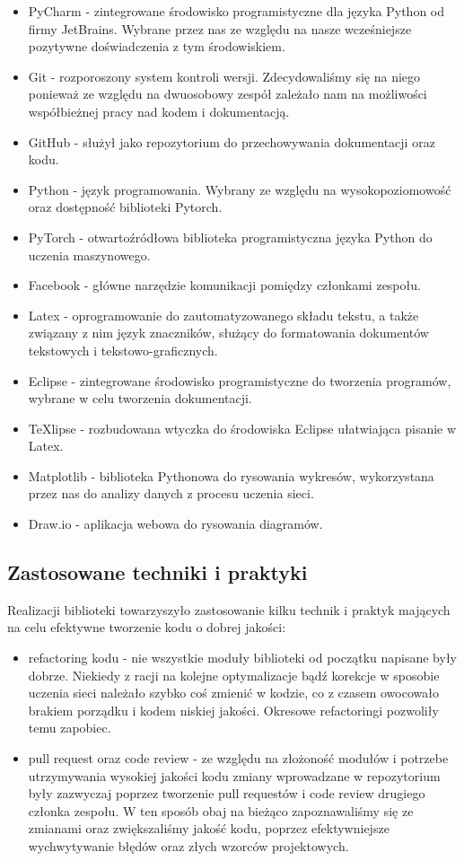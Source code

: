 \begin{itemize}
  \item PyCharm - zintegrowane środowisko programistyczne dla języka Python od firmy JetBrains.
  Wybrane przez nas ze względu na nasze wcześniejsze pozytywne doświadczenia z tym środowiskiem.
  \item Git - rozporoszony system kontroli wersji. Zdecydowaliśmy się na niego ponieważ ze względu na 
  dwuosobowy zespół zależało nam na możliwości współbieżnej pracy nad kodem i dokumentacją.
  \item GitHub - służył jako repozytorium do przechowywania dokumentacji oraz kodu.
  \item Python - język programowania. Wybrany ze względu na wysokopoziomowość oraz dostępność biblioteki Pytorch.
  \item PyTorch - otwartoźródłowa biblioteka programistyczna języka Python do uczenia maszynowego.
  \item Facebook - główne narzędzie komunikacji pomiędzy członkami zespołu.
  \item Latex - oprogramowanie do zautomatyzowanego składu tekstu, a także związany z nim język 
  znaczników, służący do formatowania dokumentów tekstowych i tekstowo-graficznych. 
  \item Eclipse - zintegrowane środowisko programistyczne do tworzenia programów, wybrane w celu tworzenia 
  dokumentacji.
  \item TeXlipse - rozbudowana wtyczka do środowiska Eclipse ułatwiająca pisanie w Latex.  
  \item Matplotlib - biblioteka Pythonowa do rysowania wykresów, wykorzystana przez nas do analizy danych 
  z procesu uczenia sieci. 
  \item Draw.io - aplikacja webowa do rysowania diagramów.
\end{itemize}

\subsection{Zastosowane techniki i praktyki}
Realizacji biblioteki towarzyszyło zastosowanie kilku technik i praktyk mających na celu efektywne 
tworzenie kodu o dobrej jakości:
\begin{itemize}
  \item refactoring kodu - nie wszystkie moduły biblioteki od początku napisane były dobrze. Niekiedy z racji 
  na kolejne optymalizacje bądź korekcje w sposobie uczenia sieci należało szybko coś zmienić w kodzie,
  co z czasem owocowało brakiem porządku i kodem niskiej jakości. Okresowe refactoringi pozwoliły temu zapobiec.
  \item pull request oraz code review - ze względu na złożoność modułów i potrzebe utrzymywania wysokiej
  jakości kodu zmiany wprowadzane w repozytorium były zazwyczaj poprzez tworzenie pull requestów i code review
  drugiego członka zespołu. W ten sposób obaj na bieżąco zapoznawaliśmy się ze zmianami oraz zwiększaliśmy
  jakość kodu, poprzez efektywniejsze wychwytywanie błędów oraz złych wzorców projektowych.
\end{itemize}

